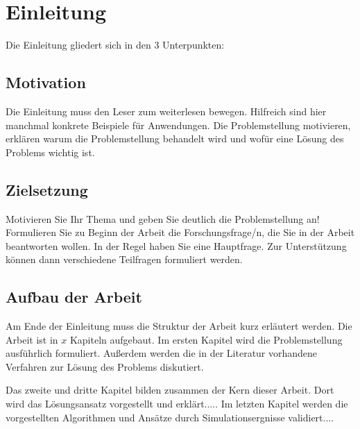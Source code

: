 
\chapter{Einleitung}

Die Einleitung gliedert sich in den 3 Unterpunkten:

\section{Motivation} 

Die Einleitung muss den Leser zum weiterlesen bewegen. Hilfreich sind hier manchmal konkrete Beispiele für Anwendungen.
Die Problemstellung motivieren, erklären warum die Problemstellung behandelt wird und wofür eine Lösung des Problems wichtig ist.

\section{Zielsetzung} 

Motivieren Sie Ihr Thema und geben Sie deutlich die Problemstellung an!
Formulieren Sie zu Beginn der Arbeit die Forschungsfrage/n, die Sie in der Arbeit beantworten wollen. In der Regel haben Sie eine Hauptfrage. Zur Unterstützung können dann verschiedene Teilfragen formuliert werden.

\section{Aufbau der Arbeit} 

Am Ende der Einleitung muss die Struktur der Arbeit kurz erläutert werden.
Die Arbeit ist in $x$ Kapiteln aufgebaut. Im ersten Kapitel wird die Problemstellung ausführlich formuliert. Außerdem werden die in der Literatur vorhandene Verfahren zur Lösung des Problems diskutiert.

Das zweite und dritte Kapitel bilden zusammen der Kern dieser Arbeit. Dort wird das Lösungsansatz vorgestellt und erklärt.....
Im letzten Kapitel werden die vorgestellten Algorithmen und Ansätze durch Simulationsergnisse validiert....



